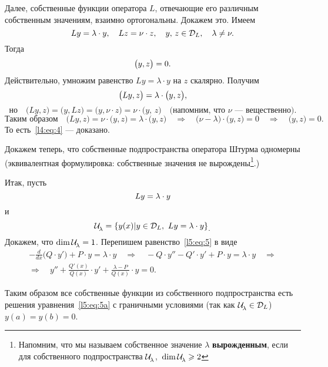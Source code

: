 \documentclass[12pt,a4paper,openany,fleqn]{book}
\newcommand{\mc}[1]{\ensuremath{\mathcal{#1}}}
\newcommand{\der}[2]{\ensuremath{\frac{d#1}{d#2}}}
\newcommand{\LL}{\ensuremath{L}}
\newcommand{\Ul}[1][\lambda]{\ensuremath{\mc{U}\!{\mathstrut}_{#1}}}
\theoremstyle{definition}
\begin{document}
Далее, собственные функции оператора \LL, отвечающие его различным собственным значениям, взаимно ортогональны. Докажем это. Имеем
\begin{equation*}
	\hfill\LL y=\lambda\cdot y,\quad\LL z=\nu\cdot z,\quad y,\,z\in\mc{D}_{\LL},\quad \lambda\neq\nu.\hfill
\end{equation*}   
Тогда 
\begin{equation}
	\label{l4:eq:4}
	\hfill \big(y,z\big)=0.\hfill
\end{equation}
Действительно, умножим равенство $\LL y=\lambda\cdot y$ на $z$ скалярно. Получим
\begin{equation*}
	\hfill\big(\LL y,z\big)=\lambda\cdot\big(y,z\big),\hfill
\end{equation*}
\begin{equation*}
	\text{но}\quad\big(\LL y,z\big)=\big(y,\LL z\big)=\big(y,\nu\cdot z\big)=\nu\cdot\big(y,\,z\big)\quad\text{(напомним, что $\nu$ --- вещественно).}
\end{equation*}
\begin{equation*}
	\text{Таким образом}\quad\big(\LL y,z\big)=\nu\cdot\big(y,z\big)=\lambda\cdot\big(y,z\big)\quad\Rightarrow\quad \big(\nu-\lambda\big)\cdot \big(y,z\big)=0\quad\Rightarrow\quad\big(y,z\big)=0.
\end{equation*}
То есть~\eqref{l4:eq:4} --- доказано.

Докажем теперь, что собственные подпространства оператора Штурма одномерны (эквивалентная формулировка: собственные значения не вырождены\footnote{Напомним, что мы называем собственное значение $\lambda$ \textbf{вырожденным}, если для собственного подпространства \Ul,\ $\dim\Ul\geqslant2$}.)

Итак, пусть 
\begin{equation}
	\label{l5:eq:5}
	\hfill\LL y=\lambda\cdot y\hfill
\end{equation}
и
\begin{equation*}
	\hfill\Ul=\left\{y(x)|y\in\mc{D}_{\LL},\ Ly=\lambda\cdot y\right\}_{\displaystyle.}\hfill
\end{equation*}
Докажем, что $\dim\Ul=1$. Перепишем равенство~\eqref{l5:eq:5} в виде
\begin{multline}
	\label{l5:eq:5a}
	-\der{}{x}\big(Q\cdot y'\big)+P\cdot y=\lambda\cdot y\quad\Rightarrow\quad-Q\cdot y''-Q'\cdot y'+P\cdot y=\lambda\cdot y\quad\Rightarrow\\\Rightarrow\quad y''+\frac{Q'(x)}{Q(x)}\cdot y'+\frac{\lambda-P}{Q(x)}\cdot y=0.\tag{\theequation a}	
\end{multline}
\addtocounter{equation}{1} Таким образом все собственные функции из собственного подпространства есть решения уравнения~\eqref{l5:eq:5a} с граничными условиями (так как $\Ul\in\mc{D}_{L}$) $y(a)=y(b)=0$.
\end{document}
